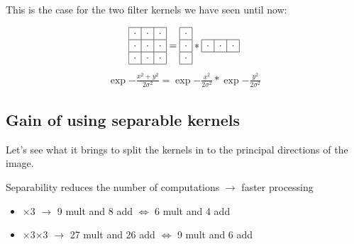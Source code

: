 \documentclass[letterpaper,10pt,english]{sphinxmanual}
\begin{document}
\sphinxAtStartPar
This is the case for the two filter kernels we have seen until now:

\sphinxAtStartPar
{}
\begin{equation*}
\begin{split}\begin{array}{|c|c|c|}
\hline\cdot&\cdot&\cdot\\
\hline\cdot&\cdot&\cdot\\
\hline\cdot&\cdot&\cdot\\
\hline\end{array}=\begin{array}{|c|}\hline\cdot \\
\hline\cdot\\
\hline\cdot\\
\hline\end{array}*
\begin{array}{|c|c|c|}\hline\cdot&\cdot&\cdot\\\hline\end{array}\end{split}
\end{equation*}
\sphinxAtStartPar
{}
\begin{equation*}
\begin{split}\exp{-\frac{x^2+y^2}{2\sigma^2}}=\exp{-\frac{x^2}{2\sigma^2}}*\exp{-\frac{y^2}{2\sigma^2}}\end{split}
\end{equation*}

\subsection{Gain of using separable kernels}
\label{\detokenize{02-ImageEnhancement:gain-of-using-separable-kernels}}
\sphinxAtStartPar
Let’s see what it brings to split the kernels in to the principal directions of the image.

\sphinxAtStartPar
Separability reduces the number of computations \(\rightarrow\) faster processing
\begin{itemize}
\item {} 
\(\times\)3 \(\rightarrow\) 9 mult and 8 add \(\Leftrightarrow\) 6 mult and 4 add

\item {} 
\(\times\)3\(\times\)3 \(\rightarrow\) 27 mult and 26 add \(\Leftrightarrow\) 9 mult and 6 add

\end{itemize}
\end{document}
